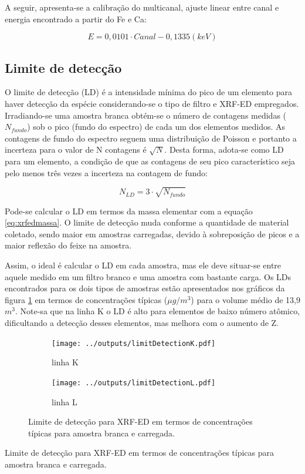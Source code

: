 A seguir, apresenta-se a calibração do multicanal, ajuste linear entre canal 
e energia encontrado a partir do Fe e Ca:

\begin{equation}
  E = 0,0101 \cdot Canal - 0,1335 (keV)
\end{equation}

\subsection{Limite de detecção}

O limite de detecção (LD) é a intensidade mínima do pico de um elemento para haver 
detecção da espécie considerando-se o tipo de filtro e XRF-ED empregados. 
Irradiando-se uma amostra branca obtém-se o número de contagens 
medidas ($N_{fundo}$) sob o pico (fundo do espectro) de cada um dos elementos
medidos.
As contagens de fundo do espectro seguem uma distribuição de Poisson e portanto 
a incerteza para o valor de N contagens é $\sqrt{N}$.
Desta forma, adota-se como LD para um elemento, a condição de que as contagens de seu pico 
característico seja pelo menos três vezes a incerteza na contagem de fundo:

\begin{equation}
  \label{eq:limitedeteccao}
  N_{LD} = 3 \cdot \sqrt{N_{fundo}}
\end{equation}

Pode-se calcular o LD em termos da massa elementar com a 
equação \ref{eq:xrfedmassa}. O limite de detecção muda conforme a quantidade de 
material coletado, sendo maior em amostras carregadas, devido à sobreposição de 
picos e a maior reflexão do feixe na amostra.

Assim, o ideal é calcular o LD em cada amostra, mas ele deve situar-se entre 
aquele medido em um filtro branco e uma amostra com bastante carga.
Os LDs encontrados para os dois tipos de amostras estão apresentados 
nos gráficos da figura \ref{table:ld} em termos de concentrações típicas 
($\mu g / m^3$) para o volume médio de 13,9 $m^3$. 
Note-sa que na linha K o LD é alto para elementos de baixo número atômico, 
dificultando a detecção desses elementos, mas melhora com o aumento de Z. 

\begin{figure}[H]
  \begin{subfigure}[b]{0.5\textwidth}
    \texttt{[image: ../outputs/limitDetectionK.pdf]}
    \caption{linha K}
  \end{subfigure}%
  \begin{subfigure}[b]{0.5\textwidth}
    \texttt{[image: ../outputs/limitDetectionL.pdf]}
    \caption{linha L}
  \end{subfigure}
  \caption{Limite de detecção para XRF-ED em termos de concentrações típicas 
           para amostra branca e carregada.
           \label{table:ld}}
\end{figure}

\newpage
\begin{table}[H]
  \centering
  
  \caption{Limite de detecção para XRF-ED em termos de concentrações típicas 
           para amostra branca e carregada. \label{table:LD}}
\end{table}
